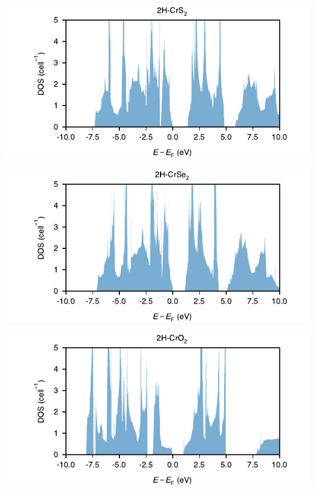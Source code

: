 \begin{center}
\includegraphics[width=.9\linewidth]{img/SI_figs/2H-CrS2-DOS.pdf}
\end{center}
\begin{center}
\includegraphics[width=.9\linewidth]{img/SI_figs/2H-CrSe2-DOS.pdf}
\end{center}
\begin{center}
\includegraphics[width=.9\linewidth]{img/SI_figs/2H-CrO2-DOS.pdf}
\end{center}